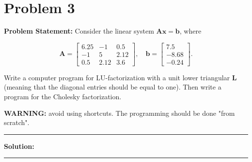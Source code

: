 \clearpage
\section*{Problem 3}

\textbf{Problem Statement:} Consider the linear system $\mathbf{Ax} = \mathbf{b}$, where

$$\mathbf{A} = \begin{bmatrix}
6.25 & -1 & 0.5 \\
-1 & 5 & 2.12 \\
0.5 & 2.12 & 3.6
\end{bmatrix}, \quad \mathbf{b} = \begin{bmatrix}
7.5 \\
-8.68 \\
-0.24
\end{bmatrix}.$$

Write a computer program for LU-factorization with a unit lower triangular $\mathbf{L}$ (meaning that the diagonal entries should be equal to one). Then write a program for the Cholesky factorization.

\textbf{WARNING:} avoid using shortcuts. The programming should be done "from scratch".

\noindent\rule{\textwidth}{0.4pt}

\vspace{1em}

\textbf{Solution:}


\vspace{2em}
\noindent\rule{\textwidth}{0.4pt}
